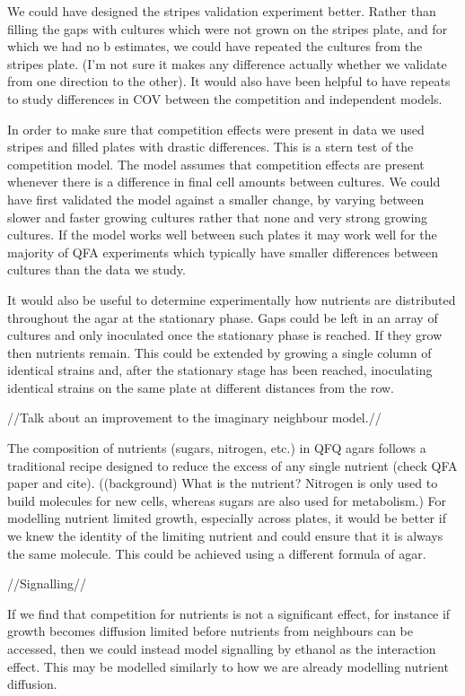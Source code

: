 We could have designed the stripes validation experiment
better. Rather than filling the gaps with cultures which were not
grown on the stripes plate, and for which we had no b estimates, we
could have repeated the cultures from the stripes plate. (I'm not sure
it makes any difference actually whether we validate from one
direction to the other). It would also have been helpful to have
repeats to study differences in COV between the competition and
independent models.

In order to make sure that competition effects were present in data we
used stripes and filled plates with drastic differences. This is a
stern test of the competition model. The model assumes that
competition effects are present whenever there is a difference in
final cell amounts between cultures. We could have first validated the
model against a smaller change, by varying between slower and faster
growing cultures rather that none and very strong growing cultures. If
the model works well between such plates it may work well for the
majority of QFA experiments which typically have smaller differences
between cultures than the data we study.

It would also be useful to determine experimentally how nutrients are
distributed throughout the agar at the stationary phase. Gaps could be
left in an array of cultures and only inoculated once the stationary
phase is reached. If they grow then nutrients remain. This could be
extended by growing a single column of identical strains and, after
the stationary stage has been reached, inoculating identical strains
on the same plate at different distances from the row.

//Talk about an improvement to the imaginary neighbour model.//

The composition of nutrients (sugars, nitrogen, etc.) in QFQ agars
follows a traditional recipe designed to reduce the excess of any
single nutrient (check QFA paper and cite). ((background) What is the
nutrient?  Nitrogen is only used to build molecules for new cells,
whereas sugars are also used for metabolism.) For modelling nutrient
limited growth, especially across plates, it would be better if we
knew the identity of the limiting nutrient and could ensure that it is
always the same molecule. This could be achieved using a different
formula of agar.

//Signalling//

If we find that competition for nutrients is not a significant effect,
for instance if growth becomes diffusion limited before nutrients from
neighbours can be accessed, then we could instead model signalling by
ethanol as the interaction effect. This may be modelled similarly to
how we are already modelling nutrient diffusion.

